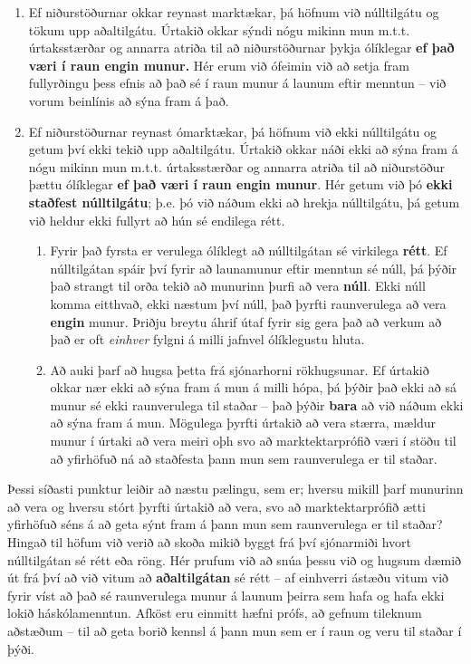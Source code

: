 \documentclass[
]{book}
\providecommand{\tightlist}{%
  \setlength{\itemsep}{0pt}\setlength{\parskip}{0pt}}
\theoremstyle{definition}
\theoremstyle{definition}
\theoremstyle{definition}
\theoremstyle{definition}
\theoremstyle{remark}
\begin{document}
\begin{enumerate}
\def\labelenumi{\arabic{enumi}.}
\tightlist
\item
  Ef niðurstöðurnar okkar reynast marktækar, þá höfnum við núlltilgátu og tökum upp aðaltilgátu. Úrtakið okkar sýndi nógu mikinn mun m.t.t. úrtaksstærðar og annarra atriða til að niðurstöðurnar þykja ólíklegar \textbf{ef það væri í raun engin munur.} Hér erum við ófeimin við að
  setja fram fullyrðingu þess efnis að það sé í raun munur á launum eftir menntun -- við vorum beinlínis að sýna fram á það.
\item
  Ef niðurstöðurnar reynast ómarktækar, þá höfnum við ekki núlltilgátu og getum því ekki tekið upp aðaltilgátu. Úrtakið okkar náði ekki að sýna fram á nógu mikinn mun m.t.t. úrtaksstærðar og annarra atriða til að niðurstöður þættu ólíklegar \textbf{ef það væri í raun engin munur}. Hér getum við þó \textbf{ekki staðfest núlltilgátu}; þ.e. þó við náðum ekki að hrekja núlltilgátu, þá getum við heldur ekki fullyrt að hún sé endilega rétt.

  \begin{enumerate}
  \def\labelenumii{\arabic{enumii}.}
  \item
    Fyrir það fyrsta er verulega ólíklegt að núlltilgátan sé virkilega \textbf{rétt}. Ef núlltilgátan spáir því fyrir að launamunur eftir menntun sé núll, þá þýðir það strangt til orða tekið að munurinn
    þurfi að vera \textbf{núll}. Ekki núll komma eitthvað, ekki næstum því núll, það þyrfti raunverulega að vera \textbf{engin} munur. Þriðju breytu áhrif útaf fyrir sig gera það að verkum að það er oft \emph{einhver} fylgni á milli jafnvel ólíklegustu hluta.
  \item
    Að auki þarf að hugsa þetta frá sjónarhorni rökhugsunar. Ef úrtakið okkar nær ekki að sýna fram á mun á milli hópa, þá þýðir það ekki að sá munur sé ekki raunverulega til staðar -- það þýðir \textbf{bara} að við náðum ekki að sýna fram á mun. Mögulega þyrfti úrtakið að vera stærra, mældur munur í úrtaki að vera meiri oþh svo að marktektarprófið væri í stöðu til að yfirhöfuð ná að staðfesta þann mun sem raunverulega er til staðar.
  \end{enumerate}
\end{enumerate}

Þessi síðasti punktur leiðir að næstu pælingu, sem er; hversu mikill þarf munurinn að vera og hversu stórt þyrfti úrtakið að vera, svo að marktektarprófið ætti yfirhöfuð séns á að geta sýnt fram á þann mun sem raunverulega er til staðar? Hingað til höfum við verið að skoða mikið byggt frá því sjónarmiði hvort núlltilgátan sé rétt eða röng. Hér prufum við að snúa þessu við og hugsum dæmið út frá því að við vitum að \textbf{aðaltilgátan} sé rétt -- af einhverri ástæðu vitum við fyrir víst að það sé raunverulega munur á launum þeirra sem hafa og hafa ekki lokið háskólamenntun. Afköst eru einmitt hæfni prófs, að gefnum tileknum aðstæðum -- til að geta borið kennsl á þann mun sem er í raun og veru til staðar í þýði.
\end{document}
